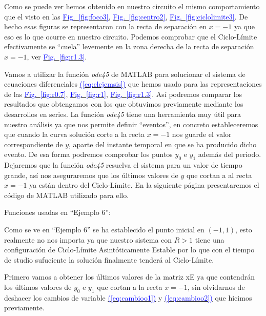 \documentclass[12pt,a4paper]{report} %
\newcommand{\fref}[1]{\hyperref[#1]{\textcolor{blue}{Fig.~\ref*{#1}}}}
\newcommand{\eref}[1]{\hyperref[#1]{\textcolor{blue}{(\ref*{#1})}}}
\newcommand{\fref}[1]{\hyperref[#1]{\textcolor{blue}{\textit{Fig.~\ref*{#1}}}}}
\newcommand{\eref}[1]{\hyperref[#1]{\textcolor{blue}{\textit{(\ref*{#1})}}}}
\begin{document}
	Como se puede ver hemos obtenido en nuestro circuito el mismo comportamiento que el visto en las \fref{fig:foco3}, \fref{fig:centro2}, \fref{fig:ciclolimite3}. De hecho esas figuras se representaron con la recta de separación en $x=-1$ ya que eso es lo que ocurre en nuestro circuito. Podemos comprobar que el Ciclo-Límite efectivamente se ``cuela'' levemente en la zona derecha de la recta de separación $x=-1$, ver \fref{fig:r1.3}.
	
	\vspace{0.5cm} Vamos a utilizar la función \textit{ode45} de MATLAB para solucionar el sistema de ecuaciones diferenciales \eref{eq:clejemsis} que hemos usado para las representaciones de las \fref{fig:r0.7}, \fref{fig:r1}, \fref{fig:r1.3}. Así podremos comparar los resultados que obtengamos con los que obtuvimos previamente mediante los desarrollos en series. La función \textit{ode45} tiene una herramienta muy útil para nuestro análisis ya que nos permite definir ``eventos'', en concreto estableceremos que cuando la curva solución corte a la recta $x=-1$ nos guarde el valor correspondiente de $y$, aparte del instante temporal en que se ha producido dicho evento. De esa forma podremos comprobar los puntos $y_0$ e $y_1$ además del periodo. Dejaremos que la función \textit{ode45} resuelva el sistema para un valor de tiempo grande, así nos aseguraremos que los últimos valores de $y$ que cortan a al recta $x=-1$ ya están dentro del Ciclo-Límite. En la siguiente página presentaremos el código de MATLAB utilizado para ello.
	
	\newpage
	
	
	
	\vspace{0.5cm}\noindent Funciones usadas en ``Ejemplo 6'':
	\vspace{0.5cm}
	\vspace{0.5cm}
	
	\newpage
	
	Como se ve en ``Ejemplo 6'' se ha establecido el punto inicial en $(-1,1)$, esto realmente no nos importa ya que nuestro sistema con $R>1$ tiene una configuración de Ciclo-Límite Asintóticamente Estable por lo que con el tiempo de studio sufuciente la solución finalmente tenderá al Ciclo-Límite. 
	
	\vspace{0.5cm}\noindent Primero vamos a obtener los últimos valores de la matriz xE ya que contendrán los últimos valores de $y_0$ e $y_1$ que cortan a la recta $x=-1$, sin olvidarnos de deshacer los cambios de variable \eref{eq:cambioo1} y \eref{eq:cambioo2} que hicimos previamente.
	
\end{document}
